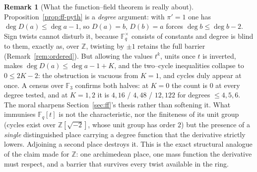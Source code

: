\documentclass[11pt]{article}
\theoremstyle{definition}
\newtheorem{remark}[theorem]{Remark}
\begin{document}
\begin{remark}[What the function--field theorem is really about]\label{rem:ffplaces}
Proposition~\ref{prop:ff-pyth} is a \emph{degree} argument: with $\pi'=1$ one has
$\deg D(a)\le\deg a-1$, so $D(a)=b$, $D(b)=a$ forces $\deg b\le\deg b-2$. Sign twists cannot
disturb it, because $\mathbb{F}_q^\times$ consists of constants and degree is blind to them,
exactly as, over $\mathbb{Z}$, twisting by $\pm1$ retains the full barrier
(Remark~\ref{rem:ordered}). But allowing the values $t^{k}$, units once $t$ is inverted, makes
$\deg D(a)\le\deg a-1+K$, and the two--cycle inequalities collapse to $0\le2K-2$: the obstruction
is vacuous from $K=1$, and cycles duly appear at once. A census over $\mathbb{F}_3$ confirms both
halves: at $K=0$ the count is $0$ at every degree tested, and at $K=1,2$ it is
$4,16$ / $4,48$ / $12,122$ for degrees $\le4,5,6$.
The moral sharpens Section~\ref{sec:ff}'s thesis rather than softening it. What immunises
$\mathbb{F}_q[t]$ is not the characteristic, nor the finiteness of its unit group (cycles exist
over $\mathbb{Z}[\sqrt{-2}]$, whose unit group has order $2$) but the presence of a
\emph{single} distinguished place carrying a degree function that the derivative strictly lowers.
Adjoining a second place destroys it. This is the exact structural analogue of the claim made for
$\mathbb{Z}$: one archimedean place, one mass function the derivative must respect, and a barrier
that survives every twist available in the ring.
\end{remark}
\end{document}
